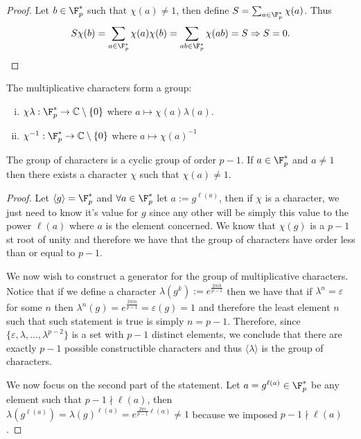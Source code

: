 \begin{proof}
    Let \(b \in \F_p^\ast\) such that \(\chi(a) \neq 1\), then define \(S =
    \sum_{a \in \F_p^\ast} \chi(a)\). Thus
    \[
        S\chi(b) = \sum_{a \in \F_p^\ast} \chi(a)\chi(b) = \sum_{ab \in \F_p^\ast}
        \chi(ab) = S \Rightarrow S = 0.
    \]
\end{proof}

\begin{proposition}
    The multiplicative characters form a group:
    \begin{enumerate}[i.]
        \item \(\chi\lambda : \F_p^\ast \to \mathbb{C} \setminus \{0\} \) where
              \(a \mapsto \chi(a)\lambda(a)\).
        \item  \(\chi^{-1}: \F_p^\ast \to \mathbb{C} \setminus \{0\} \) where \(a
              \mapsto \chi(a)^{-1}\)
    \end{enumerate}
\end{proposition}

\begin{proposition}
    The group of characters is a cyclic group of order \(p-1\). If \(a \in
    \F_p^\ast\) and \(a \neq 1\) then there exists a character \(\chi\) such
    that \(\chi(a) \neq 1\).
\end{proposition}

\begin{proof}
    Let \(\langle g \rangle = \F_p^\ast\) and \(\forall a \in \F_p^\ast\) let \(a
    := g^{\ell(a)}\), then if \(\chi\) is a character, we just need to know it's
    value for \(g\) since any other will be simply this value to the power
    \(\ell(a)\) where \(a\) is the element concerned. We know that  \(\chi(g)\)
    is a  \(p-1\)st root of unity and therefore we have that the group of
    characters have order less than or equal to \(p-1\).

    We now wish to construct a generator for the group of multiplicative
    characters. Notice that if we define a character  \(\lambda(g^k) :=
    e^{\frac{2\pi i k}{p-1}}\) then we have that if \(\lambda^n = \varepsilon\) for
    some \(n\) then \(\lambda^n(g) = e^{\frac{2\pi i n}{p-1}} = \varepsilon(g) = 1\)
    and therefore the least element \(n\) such that such statement is true is
    simply \(n = p-1\). Therefore, since \(\{\varepsilon,
    \lambda,\dots,\lambda^{p-2}\}\) is a set with \(p-1\) distinct elements, we
    conclude that there are exactly \(p-1\) possible constructible characters and
    thus \(\langle \lambda \rangle \) is the group of characters.

    We now focus on the second part of the statement. Let \(a = g^{\ell(a)} \in
    \F_p^\ast\) be any element such that \(p-1 \nmid \ell(a)\), then
    \(\lambda(g^{\ell(a)}) = \lambda(g)^{\ell(a)} = e^{\frac{2 \pi
                i}{p-1}\ell(a)} \neq 1\) because we imposed \(p-1 \nmid \ell(a)\).
\end{proof}

